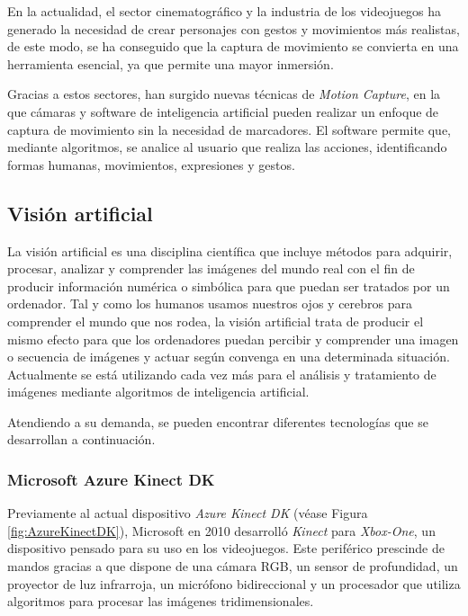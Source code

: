 En la actualidad, el sector cinematográfico y la industria de los videojuegos ha generado la necesidad de crear personajes con gestos y movimientos más realistas, de este modo, se ha conseguido que la captura de movimiento se convierta en una herramienta esencial, ya que permite una mayor inmersión. 

Gracias a estos sectores, han surgido nuevas técnicas de \textit{Motion Capture}, en la que cámaras y software de inteligencia artificial pueden realizar un enfoque de captura de movimiento sin la necesidad de marcadores. El software permite que, mediante algoritmos, se analice al usuario que realiza las acciones, identificando formas humanas, movimientos, expresiones y gestos.


\subsection{Visión artificial}

La visión artificial\cite{Visionartificial} es una disciplina científica que incluye métodos para adquirir, procesar, analizar y comprender las imágenes del mundo real con el fin de producir información numérica o simbólica para que puedan ser tratados por un ordenador. Tal y como los humanos usamos nuestros ojos y cerebros para comprender el mundo que nos rodea, la visión artificial trata de producir el mismo efecto para que los ordenadores puedan percibir y comprender una imagen o secuencia de imágenes y actuar según convenga en una determinada situación. Actualmente se está utilizando cada vez más para el análisis y tratamiento de imágenes mediante algoritmos de inteligencia artificial. 

Atendiendo a su demanda, se pueden encontrar diferentes tecnologías que se desarrollan a continuación.

\subsubsection{Microsoft Azure Kinect DK}

Previamente al actual dispositivo \textit{Azure Kinect DK} (véase Figura \ref{fig:AzureKinectDK}), Microsoft en 2010 desarrolló \textit{Kinect} para \textit{Xbox-One}, un dispositivo pensado para su uso en los videojuegos. Este periférico prescinde de mandos gracias a que dispone de una cámara RGB, un sensor de profundidad, un proyector de luz infrarroja, un micrófono bidireccional y un procesador que utiliza algoritmos para procesar las imágenes tridimensionales.

